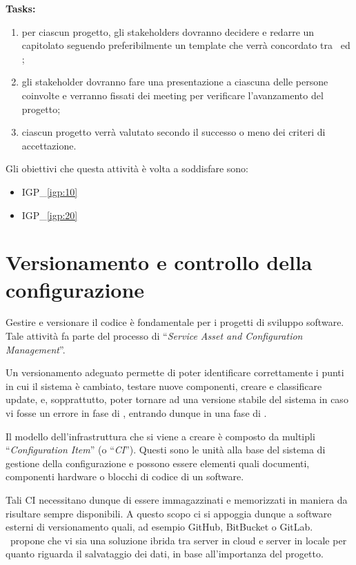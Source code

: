 		\textbf{Tasks:}
		\begin{enumerate}[noitemsep]
			\item per ciascun progetto, gli stakeholders dovranno decidere e redarre un capitolato seguendo preferibilmente un template che verrà concordato tra \azienda~ed \istituto;
			\item gli stakeholder dovranno fare una presentazione a ciascuna delle persone coinvolte e verranno fissati dei meeting per verificare l'avanzamento del progetto;
			\item ciascun progetto verrà valutato secondo il successo o meno dei criteri di accettazione.
		\end{enumerate}
	
		Gli obiettivi che questa attività è volta a soddisfare sono:
		\begin{itemize}[noitemsep]
			\renewcommand\labelitemi{--}
			\item {\color{pantone}IGP\_\ref{igp:10}}
			\item {\color{pantone}IGP\_\ref{igp:20}}
		\end{itemize}

\newpage
\section{Versionamento e controllo della configurazione}\label{sec:configurazione}

	Gestire e versionare il codice è fondamentale per i progetti di sviluppo software.	
	Tale attività fa parte del processo di ``\textit{Service Asset and Configuration Management}''.
	
	Un versionamento adeguato permette di poter identificare correttamente i punti in cui il sistema è cambiato, testare nuove componenti, creare e classificare update, e, sopprattutto, poter tornare ad una versione stabile del sistema in caso vi fosse un errore in fase di \rollout, entrando dunque in una fase di \rollback.
	
	Il modello dell'infrastruttura che si viene a creare è composto da multipli ``\textit{Configuration Item}'' (o ``\textit{CI}'').
	Questi sono le unità alla base del sistema di gestione della configurazione e possono essere elementi quali documenti, componenti hardware o blocchi di codice di un software.
	
	Tali CI necessitano dunque di essere immagazzinati e memorizzati in maniera da risultare sempre disponibili.
	A questo scopo ci si appoggia dunque a software esterni di versionamento quali, ad esempio GitHub\cite{github}, BitBucket\cite{bitbucket} o GitLab\cite{gitlab}.
	\azienda~propone che vi sia una soluzione ibrida tra server in cloud e server in locale per quanto riguarda il salvataggio dei dati, in base all'importanza del progetto.
	
